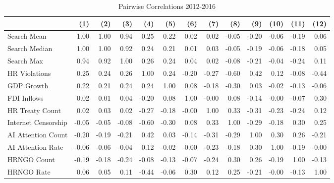 \begin{table}[ht]
\centering
\begin{tabular}{|l|rrrrrrrrrrrr|}
  \hline
 & (1) & (2) & (3) & (4) & (5) & (6) & (7) & (8) & (9) & (10) & (11) & (12) \\ 
  \hline
Search Mean & 1.00 & 1.00 & 0.94 & 0.25 & 0.22 & 0.02 & 0.02 & -0.05 & -0.20 & -0.06 & -0.19 & 0.06 \\ 
  Search Median & 1.00 & 1.00 & 0.92 & 0.24 & 0.21 & 0.01 & 0.03 & -0.05 & -0.19 & -0.06 & -0.18 & 0.05 \\ 
  Search Max & 0.94 & 0.92 & 1.00 & 0.26 & 0.24 & 0.04 & 0.02 & -0.08 & -0.21 & -0.04 & -0.24 & 0.11 \\ 
  HR Violations & 0.25 & 0.24 & 0.26 & 1.00 & 0.24 & -0.20 & -0.27 & -0.60 & 0.42 & 0.12 & -0.08 & -0.44 \\ 
  GDP Growth & 0.22 & 0.21 & 0.24 & 0.24 & 1.00 & 0.08 & -0.18 & -0.30 & 0.03 & -0.02 & -0.13 & -0.06 \\ 
  FDI Inflows & 0.02 & 0.01 & 0.04 & -0.20 & 0.08 & 1.00 & -0.00 & 0.08 & -0.14 & -0.00 & -0.07 & 0.30 \\ 
  HR Treaty Count & 0.02 & 0.03 & 0.02 & -0.27 & -0.18 & -0.00 & 1.00 & 0.33 & -0.31 & -0.23 & -0.24 & 0.12 \\ 
  Internet Censorship & -0.05 & -0.05 & -0.08 & -0.60 & -0.30 & 0.08 & 0.33 & 1.00 & -0.29 & -0.18 & 0.30 & 0.25 \\ 
  AI Attention Count & -0.20 & -0.19 & -0.21 & 0.42 & 0.03 & -0.14 & -0.31 & -0.29 & 1.00 & 0.30 & 0.26 & -0.21 \\ 
  AI Attention Rate & -0.06 & -0.06 & -0.04 & 0.12 & -0.02 & -0.00 & -0.23 & -0.18 & 0.30 & 1.00 & -0.19 & -0.00 \\ 
  HRNGO Count & -0.19 & -0.18 & -0.24 & -0.08 & -0.13 & -0.07 & -0.24 & 0.30 & 0.26 & -0.19 & 1.00 & -0.13 \\ 
  HRNGO Rate & 0.06 & 0.05 & 0.11 & -0.44 & -0.06 & 0.30 & 0.12 & 0.25 & -0.21 & -0.00 & -0.13 & 1.00 \\ 
   \hline
\end{tabular}
\caption{Pairwise Correlations 2012-2016} 
\end{table}
